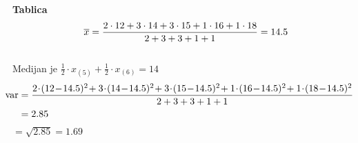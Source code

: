 \documentclass{article}%
\begin{document}
%
\normalsize%
\renewcommand{\arraystretch}{1.5}%
\textbf{\huge Tablica\\}%
%
\Large \[ \overline{x} = \frac{%
2 \cdot 12 + 3 \cdot 14 + 3 \cdot 15 + 1 \cdot 16 + 1 \cdot 18%
}{%
2 + 3 + 3 + 1 + 1%
} = 14.5\] \\%
Medijan je $\frac{1}{2} \cdot x_{(5)}+\frac{1}{2} \cdot x_{(6)}=14$ \\%
\begin{align*}%
\hspace*{-\leftmargin} %
\text{var} &= \frac{%
2\! \cdot \!(12\!-\!14.5)^2\! + 3\! \cdot \!(14\!-\!14.5)^2\! + 3\! \cdot \!(15\!-\!14.5)^2\! + 1\! \cdot \!(16\!-\!14.5)^2\! + 1\! \cdot \!(18\!-\!14.5)^2%
}{%
2 + 3 + 3 + 1 + 1%
}%
\\%
&= 2.85%
\end{align*}%
 $= \sqrt{2.85} = 1.69$ \\%
\end{document}
